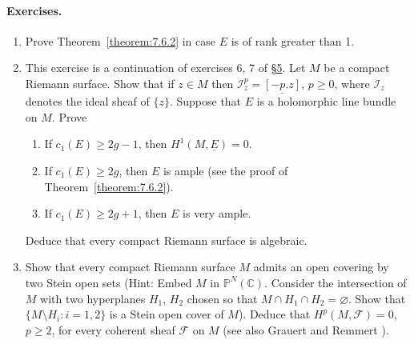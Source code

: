 \paragraph{Exercises.}
\begin{enumerate}
\item Prove Theorem~\ref{theorem:7.6.2} in case $E$ is of rank greater than 1.
\item This exercise is a continuation of exercises 6, 7 of \hyperref[sec:7:5]{\S5}. Let $M$ be a compact Riemann surface. Show that if $z\in M$ then $\mathcal{I}_z^p=\underline{[-p.z]}$, $p\geq0$, where $\mathcal{I}_z$ denotes the ideal sheaf of $\{z\}$. Suppose that $E$ is a holomorphic line bundle on $M$. Prove
\begin{enumerate}[label=\alph*)]
\item If $c_1(E)\geq2g-1$, then $H^1(M,\underline{E})=0$.
\item If $c_1(E)\geq2g$, then $E$ is ample (see the proof of Theorem~\ref{theorem:7.6.2}).
\item If $c_1(E)\geq2g+1$, then $E$ is very ample.
\end{enumerate}
Deduce that every compact Riemann surface is algebraic.
\item Show that every compact Riemann surface $M$ admits an open covering by two Stein open sets (Hint: Embed $M$ in $\mathbb{P}^N(\mathbb{C})$. Consider the intersection of $M$ with two hyperplanes $H_1$, $H_2$ chosen so that $M\cap H_1\cap H_2=\varnothing$. Show that $\{M\setminus H_i:i=1,2\}$ is a Stein open cover of $M$). Deduce that $H^p(M,\mathcal{F})=0$, $p\geq2$, for every coherent sheaf $\mathcal{F}$ on $M$ (see also Grauert and Remmert \cite[page 210]{bib:II:grauert-h-and-remmert-r:1}).
\end{enumerate}
